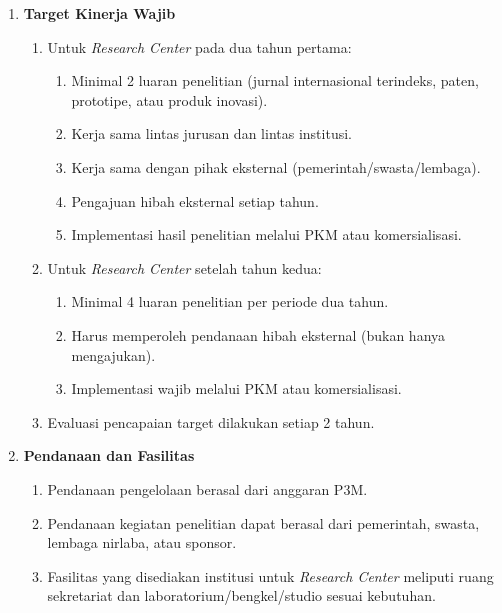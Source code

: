 \documentclass[12pt,a4paper]{article}
\begin{document}
\begin{enumerate}[leftmargin=*]
    \item \textbf{Target Kinerja Wajib}
          \begin{enumerate}
              \item Untuk \textit{Research Center} pada dua tahun pertama:
                    \begin{enumerate}
                        \item Minimal 2 luaran penelitian (jurnal internasional terindeks, paten, prototipe, atau produk inovasi).
                        \item Kerja sama lintas jurusan dan lintas institusi.
                        \item Kerja sama dengan pihak eksternal (pemerintah/swasta/lembaga).
                        \item Pengajuan hibah eksternal setiap tahun.
                        \item Implementasi hasil penelitian melalui PKM atau komersialisasi.
                    \end{enumerate}
              \item Untuk \textit{Research Center} setelah tahun kedua:
                    \begin{enumerate}
                        \item Minimal 4 luaran penelitian per periode dua tahun.
                        \item Harus memperoleh pendanaan hibah eksternal (bukan hanya mengajukan).
                        \item Implementasi wajib melalui PKM atau komersialisasi.
                    \end{enumerate}
              \item Evaluasi pencapaian target dilakukan setiap 2 tahun.
          \end{enumerate}

    \item \textbf{Pendanaan dan Fasilitas}
          \begin{enumerate}
              \item Pendanaan pengelolaan berasal dari anggaran P3M.
              \item Pendanaan kegiatan penelitian dapat berasal dari pemerintah, swasta, lembaga nirlaba, atau sponsor.
              \item Fasilitas yang disediakan institusi untuk \textit{Research Center} meliputi ruang sekretariat dan laboratorium/bengkel/studio sesuai kebutuhan.
          \end{enumerate}
\end{enumerate}
\end{document}
